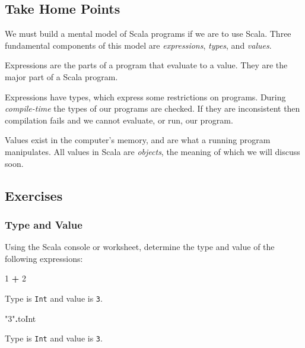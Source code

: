 \documentclass[11pt,a5paper,]{book}
\newenvironment{Shaded}{\begin{snugshade}}{\end{snugshade}}
\newcommand{\DecValTok}[1]{\textcolor[rgb]{0.00,0.00,0.81}{#1}}
\newcommand{\NormalTok}[1]{#1}
\newcommand{\OperatorTok}[1]{\textcolor[rgb]{0.81,0.36,0.00}{\textbf{#1}}}
\newcommand{\StringTok}[1]{\textcolor[rgb]{0.31,0.60,0.02}{#1}}
\begin{document}
\hypertarget{take-home-points}{%
\subsection{Take Home Points}\label{take-home-points}}

We must build a mental model of Scala programs if we are to use Scala.
Three fundamental components of this model are \emph{expressions},
\emph{types}, and \emph{values}.

Expressions are the parts of a program that evaluate to a value. They
are the major part of a Scala program.

Expressions have types, which express some restrictions on programs.
During \emph{compile-time} the types of our programs are checked. If
they are inconsistent then compilation fails and we cannot evaluate, or
run, our program.

Values exist in the computer's memory, and are what a running program
manipulates. All values in Scala are \emph{objects}, the meaning of
which we will discuss soon.

\hypertarget{exercises}{%
\subsection{Exercises}\label{exercises}}

\hypertarget{type-and-value}{%
\subsubsection{Type and Value}\label{type-and-value}}

Using the Scala console or worksheet, determine the type and value of
the following expressions:

\begin{Shaded}
\begin{Highlighting}[]
\DecValTok{1} \OperatorTok{+} \DecValTok{2}
\end{Highlighting}
\end{Shaded}

Type is \texttt{Int} and value is \texttt{3}.

\begin{Shaded}
\begin{Highlighting}[]
\StringTok{"3"}\OperatorTok{.}\NormalTok{toInt}
\end{Highlighting}
\end{Shaded}

Type is \texttt{Int} and value is \texttt{3}.
\end{document}
